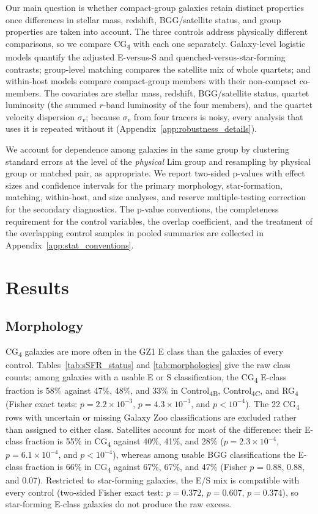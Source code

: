 \documentclass{aa}
\newcommand{\CB}{Control\textsubscript{4B}}
\newcommand{\CC}{Control\textsubscript{4C}}
\newcommand{\CG}{CG\textsubscript{4}}
\newcommand{\RG}{RG\textsubscript{4}}
\begin{document}
Our main question is whether compact-group galaxies retain distinct properties once differences in stellar mass, redshift, BGG/satellite status, and group properties are taken into account. The three controls address physically different comparisons, so we compare \CG{} with each one separately. Galaxy-level logistic models quantify the adjusted E-versus-S and quenched-versus-star-forming contrasts; group-level matching compares the satellite mix of whole quartets; and within-host models compare compact-group members with their non-compact co-members. The covariates are stellar mass, redshift, BGG/satellite status, quartet luminosity (the summed \(r\)-band luminosity of the four members), and the quartet velocity dispersion \(\sigma_v\); because \(\sigma_v\) from four tracers is noisy, every analysis that uses it is repeated without it (Appendix~\ref{app:robustness_details}).

We account for dependence among galaxies in the same group by clustering standard errors at the level of the \emph{physical} Lim group and resampling by physical group or matched pair, as appropriate. We report two-sided p-values with effect sizes and confidence intervals for the primary morphology, star-formation, matching, within-host, and size analyses, and reserve multiple-testing correction for the secondary diagnostics. The p-value conventions, the completeness requirement for the control variables, the overlap coefficient, and the treatment of the overlapping control samples in pooled summaries are collected in Appendix~\ref{app:stat_conventions}.

\section{Results}\label{sec:results}
\subsection{Morphology}\label{sec:morphology}

\CG{} galaxies are more often in the GZ1 E class than the galaxies of every control. Tables~\ref{tab:sSFR_status} and \ref{tab:morphologies} give the raw class counts; among galaxies with a usable E or S classification, the \CG{} E-class fraction is 58\% against 47\%, 48\%, and 33\% in \CB{}, \CC{}, and \RG{} (Fisher exact tests: \(p = 2.2\times 10^{-3}\), \(p = 4.3\times 10^{-3}\), and \(p<10^{-4}\)). The 22 \CG{} rows with uncertain or missing Galaxy Zoo classifications are excluded rather than assigned to either class. Satellites account for most of the difference: their E-class fraction is 55\% in \CG{} against 40\%, 41\%, and 28\% (\(p = 2.3\times 10^{-4}\), \(p = 6.1\times 10^{-4}\), and \(p<10^{-4}\)), whereas among usable BGG classifications the E-class fraction is 66\% in \CG{} against 67\%, 67\%, and 47\% (Fisher \(p\) = 0.88, 0.88, and 0.07). Restricted to star-forming galaxies, the E/S mix is compatible with every control (two-sided Fisher exact test: \(p = 0.372\), \(p = 0.607\), \(p = 0.374\)), so star-forming E-class galaxies do not produce the raw excess.
\end{document}
